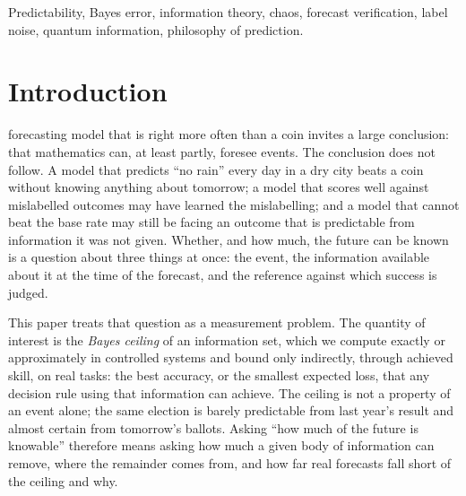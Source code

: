 \documentclass[journal]{IEEEtran}
\theoremstyle{definition}
\begin{document}
\begin{IEEEkeywords}
Predictability, Bayes error, information theory, chaos, forecast verification, label noise, quantum information, philosophy of prediction.
\end{IEEEkeywords}

\section{Introduction}
 forecasting model that is right more often than a coin invites a large conclusion: that mathematics can, at least partly, foresee events. The conclusion does not follow. A model that predicts ``no rain'' every day in a dry city beats a coin without knowing anything about tomorrow; a model that scores well against mislabelled outcomes may have learned the mislabelling; and a model that cannot beat the base rate may still be facing an outcome that is predictable from information it was not given. Whether, and how much, the future can be known is a question about three things at once: the event, the information available about it at the time of the forecast, and the reference against which success is judged.

This paper treats that question as a measurement problem. The quantity of interest is the \emph{Bayes ceiling} of an information set, which we compute exactly or approximately in controlled systems and bound only indirectly, through achieved skill, on real tasks: the best accuracy, or the smallest expected loss, that any decision rule using that information can achieve. The ceiling is not a property of an event alone; the same election is barely predictable from last year's result and almost certain from tomorrow's ballots. Asking ``how much of the future is knowable'' therefore means asking how much a given body of information can remove, where the remainder comes from, and how far real forecasts fall short of the ceiling and why.
\end{document}
